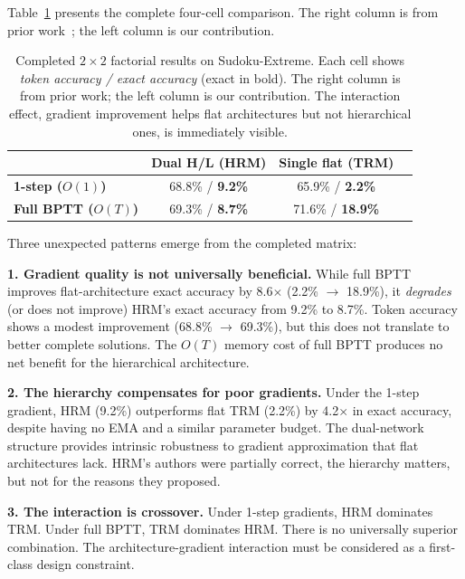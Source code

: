 \documentclass{article}
\begin{document}
Table~\ref{tab:fullmatrix} presents the complete four-cell comparison. The right column is from prior work~\cite{jj2025disentangling}; the left column is our contribution.

\begin{table}[t]
\centering
\caption{Completed $2\times2$ factorial results on Sudoku-Extreme. Each cell shows \textit{token accuracy / exact accuracy} (exact in bold). The right column is from prior work; the left column is our contribution. The interaction effect, gradient improvement helps flat architectures but not hierarchical ones, is immediately visible.}
\label{tab:fullmatrix}
\begin{tabular}{lccc}
\toprule
& \textbf{Dual H/L (HRM)} & \textbf{Single flat (TRM)} \\
\midrule
\textbf{1-step ($O(1)$)}  & 68.8\% / \textbf{9.2\%}  & 65.9\% / \textbf{2.2\%}  \\
\textbf{Full BPTT ($O(T)$)} & 69.3\% / \textbf{8.7\%}  & 71.6\% / \textbf{18.9\%} \\
\bottomrule
\end{tabular}
\end{table}

Three unexpected patterns emerge from the completed matrix:

\textbf{1. Gradient quality is not universally beneficial.} While full BPTT improves flat-architecture exact accuracy by 8.6$\times$ (2.2\% $\rightarrow$ 18.9\%), it \emph{degrades} (or does not improve) HRM's exact accuracy from 9.2\% to 8.7\%. Token accuracy shows a modest improvement (68.8\% $\rightarrow$ 69.3\%), but this does not translate to better complete solutions. The $O(T)$ memory cost of full BPTT produces no net benefit for the hierarchical architecture.

\textbf{2. The hierarchy compensates for poor gradients.} Under the 1-step gradient, HRM (9.2\%) outperforms flat TRM (2.2\%) by 4.2$\times$ in exact accuracy, despite having no EMA and a similar parameter budget. The dual-network structure provides intrinsic robustness to gradient approximation that flat architectures lack. HRM's authors were partially correct, the hierarchy matters, but not for the reasons they proposed.

\textbf{3. The interaction is crossover.} Under 1-step gradients, HRM dominates TRM. Under full BPTT, TRM dominates HRM. There is no universally superior combination. The architecture-gradient interaction must be considered as a first-class design constraint.
\end{document}
